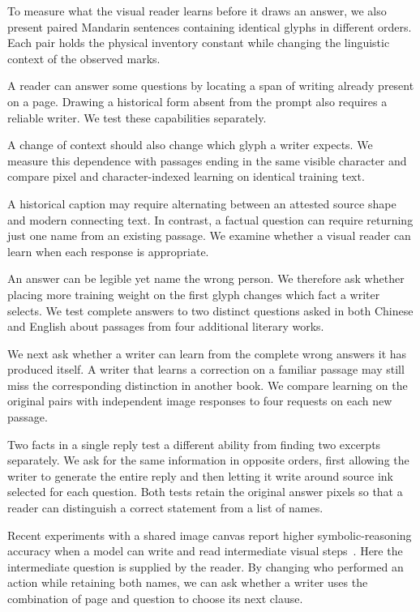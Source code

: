 To measure what the visual reader learns before it draws an answer, we also
present paired Mandarin sentences containing identical glyphs in different
orders. Each pair holds the physical inventory constant while changing the
linguistic context of the observed marks.

A reader can answer some questions by locating a span of writing already
present on a page. Drawing a historical form absent from the prompt also
requires a reliable writer. We test these capabilities separately.

A change of context should also change which glyph a writer expects. We
measure this dependence with passages ending in the same visible character
and compare pixel and character-indexed learning on identical training text.

A historical caption may require alternating between an attested source shape
and modern connecting text. In contrast, a factual question can require
returning just one name from an existing passage. We examine whether a
visual reader can learn when each response is appropriate.

An answer can be legible yet name the wrong person. We therefore ask whether placing more training weight on the first glyph changes which fact a writer selects. We test complete answers to two distinct questions asked in both Chinese and English about passages from four additional literary works.

We next ask whether a writer can learn from the complete wrong answers it has produced itself. A writer that learns a correction on a familiar passage may still miss the corresponding distinction in another book. We compare learning on the original pairs with independent image responses to four requests on each new passage.

Two facts in a single reply test a different ability from finding two excerpts separately. We ask for the same information in opposite orders, first allowing the writer to generate the entire reply and then letting it write around source ink selected for each question. Both tests retain the original answer pixels so that a reader can distinguish a correct statement from a list of names.

Recent experiments with a shared image canvas report higher symbolic-reasoning accuracy when a model can write and read intermediate visual steps~\cite{chucanvas}. Here the intermediate question is supplied by the reader. By changing who performed an action while retaining both names, we can ask whether a writer uses the combination of page and question to choose its next clause.

